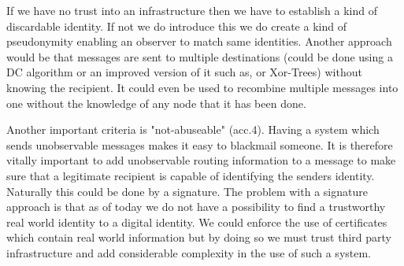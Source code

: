 \documentclass[12pt,journal,compsoc,peerreview]{IEEEtran}
\begin{document}
\par
If we have no trust into an infrastructure then we have to establish a kind of discardable identity. If not we do introduce this we do create a kind of pseudonymity enabling an observer to match same identities. Another approach would be that messages are sent to multiple destinations (could be done using a DC algorithm\cite{chaum-dc} or an improved version of it such as\cite{golle:eurocrypt2004}, or Xor-Trees\cite{xor-trees}) without knowing the recipient. It could even be used to recombine multiple messages into one without the knowledge of any node that it has been done.
\par
Another important criteria is "not-abuseable" (acc.4). Having a system which sends unobservable messages makes it easy to blackmail someone. It is therefore vitally important to add unobservable routing information to a message to make sure that a legitimate recipient is capable of identifying the senders identity. Naturally this could be done by a signature. The problem with a signature approach is that as of today we do not have a possibility to find a trustworthy real world identity to a digital identity. We could enforce the use of certificates which contain real world information but by doing so we must trust third party infrastructure and add considerable complexity in the use of such a system.
\end{document}

